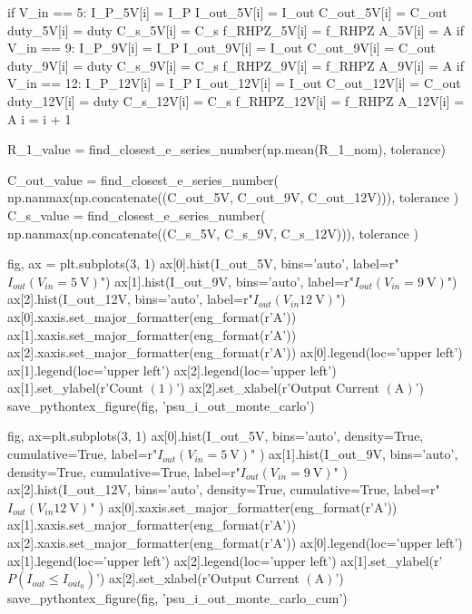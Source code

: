 \documentclass[12pt, titlepage]{/home/air/projects/latex-template/tex-template}
\begin{document}
\begin{pycode}
        if V_in == 5:
            I_P_5V[i] = I_P
            I_out_5V[i] = I_out
            C_out_5V[i] = C_out
            duty_5V[i] = duty
            C_s_5V[i] = C_s
            f_RHPZ_5V[i] = f_RHPZ
            A_5V[i] = A
        if V_in == 9:
            I_P_9V[i] = I_P
            I_out_9V[i] = I_out
            C_out_9V[i] = C_out
            duty_9V[i] = duty
            C_s_9V[i] = C_s
            f_RHPZ_9V[i] = f_RHPZ
            A_9V[i] = A
        if V_in == 12:
            I_P_12V[i] = I_P
            I_out_12V[i] = I_out
            C_out_12V[i] = C_out
            duty_12V[i] = duty
            C_s_12V[i] = C_s
            f_RHPZ_12V[i] = f_RHPZ
            A_12V[i] = A
    i = i + 1

R_1_value = find_closest_e_series_number(np.mean(R_1_nom), tolerance)

C_out_value = find_closest_e_series_number(
    np.nanmax(np.concatenate((C_out_5V, C_out_9V, C_out_12V))),
    tolerance
    )
C_s_value = find_closest_e_series_number(
    np.nanmax(np.concatenate((C_s_5V, C_s_9V, C_s_12V))),
    tolerance
    )

fig, ax = plt.subplots(3, 1)
ax[0].hist(I_out_5V, bins='auto', label=r"$I_{out}(V_{in}=\SI{5}{\volt})$")
ax[1].hist(I_out_9V, bins='auto', label=r"$I_{out}(V_{in}=\SI{9}{\volt})$")
ax[2].hist(I_out_12V, bins='auto', label=r"$I_{out}(V_{in}\SI{12}{\volt})$")
ax[0].xaxis.set_major_formatter(eng_format(r'\unit{\ampere}'))
ax[1].xaxis.set_major_formatter(eng_format(r'\unit{\ampere}'))
ax[2].xaxis.set_major_formatter(eng_format(r'\unit{\ampere}'))
ax[0].legend(loc='upper left')
ax[1].legend(loc='upper left')
ax[2].legend(loc='upper left')
ax[1].set_ylabel(r'Count $\left(1\right)$')
ax[2].set_xlabel(r'Output Current $\left(\unit{\ampere}\right)$')
save_pythontex_figure(fig, 'psu_i_out_monte_carlo')

fig, ax=plt.subplots(3, 1)
ax[0].hist(I_out_5V, bins='auto', density=True, cumulative=True,
           label=r"$I_{out}(V_{in}=\SI{5}{\volt})$"
           )
ax[1].hist(I_out_9V, bins='auto', density=True, cumulative=True,
           label=r"$I_{out}(V_{in}=\SI{9}{\volt})$"
           )
ax[2].hist(I_out_12V, bins='auto', density=True, cumulative=True,
           label=r"$I_{out}(V_{in}\SI{12}{\volt})$"
           )
ax[0].xaxis.set_major_formatter(eng_format(r'\unit{\ampere}'))
ax[1].xaxis.set_major_formatter(eng_format(r'\unit{\ampere}'))
ax[2].xaxis.set_major_formatter(eng_format(r'\unit{\ampere}'))
ax[0].legend(loc='upper left')
ax[1].legend(loc='upper left')
ax[2].legend(loc='upper left')
ax[1].set_ylabel(r'$P\left(I_{out} \leq I_{out_0}\right)$')
ax[2].set_xlabel(r'Output Current $\left(\unit{\ampere}\right)$')
save_pythontex_figure(fig, 'psu_i_out_monte_carlo_cum')


\end{pycode}
\end{document}
